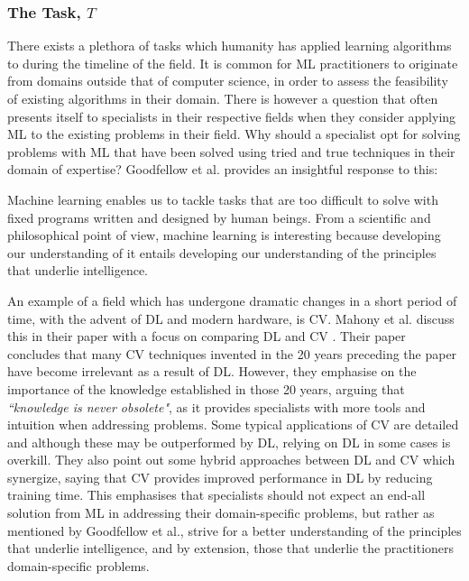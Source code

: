 \subsubsection{The Task, $T$}
There exists a plethora of tasks which humanity has applied learning algorithms
to during the timeline of the field. It is common for \gls{ML} practitioners to
originate from domains outside that of computer science, in order to assess the
feasibility of existing algorithms in their domain. There is however a question
that often presents itself to specialists in their respective fields when they
consider applying \gls{ML} to the existing problems in their field. Why should a
specialist opt for solving problems with \gls{ML} that have been solved using
tried and true techniques in their domain of expertise? Goodfellow et al.
\cite{Goodfellow-et-al-2016} provides an insightful response to this:

\begin{fancyquotes}
    Machine learning enables us to tackle tasks that are too difficult
    to solve with fixed programs written and designed by human beings. From a
    scientific and philosophical point of view, machine learning is interesting
    because developing our understanding of it entails developing our
    understanding of the principles that underlie intelligence.
\end{fancyquotes}

An example of a field which has undergone dramatic changes in a short period of
time, with the advent of \gls{DL} and modern hardware, is \gls{CV}. Mahony et
al. discuss this in their paper with a focus on comparing \gls{DL} and \gls{CV}
\cite{Mahony-et-al-2020}. Their paper concludes that many \gls{CV} techniques
invented in the 20 years preceding the paper have become irrelevant as a result
of \gls{DL}. However, they emphasise on the importance of the knowledge
established in those 20 years, arguing that \textit{``knowledge is never
obsolete"}, as it provides specialists with more tools and intuition when
addressing problems. Some typical applications of \gls{CV} are detailed and
although these may be outperformed by \gls{DL}, relying on \gls{DL} in some
cases is overkill. They also point out some hybrid approaches between \gls{DL}
and \gls{CV} which synergize, saying that \gls{CV} provides improved performance
in \gls{DL} by reducing training time. This emphasises that specialists should
not expect an end-all solution from \gls{ML} in addressing their domain-specific
problems, but rather as mentioned by Goodfellow et al., strive for a better
understanding of the principles that underlie intelligence, and by extension,
those that underlie the practitioners domain-specific problems.

